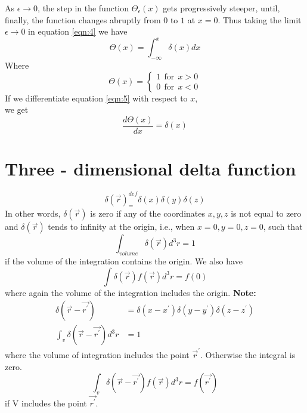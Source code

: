 		
		As $\epsilon \rightarrow 0$, the step in the function $\Theta_\epsilon(x)$ gets progressively steeper, until, finally, the function changes abruptly from $0$ to $1$ at $x=0$.
		Thus taking the limit $\epsilon \rightarrow 0$ in equation \ref{eqn:4} we have
		\begin{equation}\label{eqn:5}
			\Theta(x) = \int_{-\infty}^{x} \delta(x) dx
		\end{equation}
		Where
		\begin{equation}
			\Theta(x) = 
			\begin{cases}
				1 \ \ \text{for} \ \ x > 0 \\
				0 \ \ \text{for} \ \ x < 0
			\end{cases}
		\end{equation}
		If we differentiate equation \ref{eqn:5} with respect to $x$,\\
		we get
		\begin{equation}
			\frac{d \Theta(x)}{dx} = \delta(x)
		\end{equation}
		
	\section{Three - dimensional delta function}
		\begin{equation}
			\delta(\vec{r}) _=^{def} \delta(x) \delta(y) \delta(z)
		\end{equation}
		In other words, $\delta(\vec{r})$ is zero if any of the coordinates $x, y, z$ is not equal to zero and $\delta(\vec{r})$ tends to infinity at the origin, i.e., when $x=0, y=0, z=0$, such that 
		\begin{equation}
			\int_{volume} \delta(\vec{r}) d^3 r = 1
		\end{equation}
		if the volume of the integration contains the origin. We also have
		\begin{equation}
			\int \delta(\vec{r}) f(\vec{r}) d^3 r = f(0)
		\end{equation}
		where again the volume of the integration includes the origin.
		\textbf{Note:}
		\begin{eqnarray}
			\delta(\vec{r} - \vec{r^\prime}) &= \delta(x - x^\prime) \delta(y - y^\prime) \delta(z-z^\prime) \\
			\int_{v}\delta(\vec{r} - \vec{r^\prime}) d^3r &= 1
		\end{eqnarray}
		where the volume of integration includes the point $\vec{r}^\prime$. Otherwise the integral is zero.
		\begin{equation}
			\int_{v}\delta(\vec{r} - \vec{r^\prime}) f(\vec{r}) d^3r = f(\vec{r^\prime})
		\end{equation}
		if V includes the point $\vec{r^\prime}$.
		
